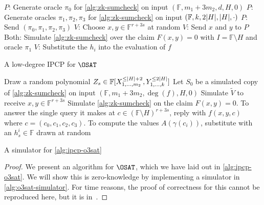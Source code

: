 \documentclass[english,12pt]{reedthesis}
\theoremstyle{plain}
\theoremstyle{definition}
\theoremstyle{remark}
\DeclarePairedDelimiter{\abs}{\lvert}{\rvert}
\begin{document}
\begin{algorithm}[htbp]
  $P$: Generate oracle $\pi_{0}$ for \cref{alg:zk-sumcheck} on input
  $(\mathbb{F}, m_{1}+3m_{2}, d, H, 0)$\;
  $P$: Generate oracles $\pi_{1}, \pi_{2}, \pi_{3}$ for \cref{alg:zk-sumcheck} on
  input $(\mathbb{F}, k, 2\abs{H}, \abs{H}, \cdot)$\;
  $P$: Send $(\pi_{0}, \pi_{1}, \pi_{2}, \pi_{3})$\;
  $V$: Choose $x, y \in \mathbb{F}^{r+3s}$ at random\;
  $V$: Send $x$ and $y$ to $P$\;
  Both: Simulate \cref{alg:zk-sumcheck} over the claim $F(x, y) = 0$ with
  $I = \mathbb{F} \setminus H$ and oracle $\pi_{1}$\;
  $V$: Substitute the $h_{i}$ into the evaluation of $f$\;
  \caption{A low-degree IPCP for $\OSAT$~\cite[p.\ 15:36]{CFGS22}}\label{alg:ipcp-o3sat}
\end{algorithm}

\begin{algorithm}[htbp]
  Draw a random polynomial
  $Z_{s} \in \mathbb{F}[X_{1, \ldots, m_{2}}^{\le \abs{H}+2}, Y_{1, \ldots, k}^{\le 2\abs{H}}]$\;
  Let $S_{0}$ be a simulated copy of \cref{alg:zk-sumcheck} on input
  $(\mathbb{F}, m_{1} + 3m_{2}, \deg(f), H, 0)$\;
  Simulate $\tilde{V}$ to receive $x, y \in \mathbb{F}^{r + 3s}$\;
  Simulate \cref{alg:zk-sumcheck} on the claim $F(x, y) = 0$. To answer the
  single query it makes at $c \in (\mathbb{F} \setminus H)^{r+3s}$, reply with
  $f(x, y, c)$ where $c = (c_{0}, c_{1}, c_{2}, c_{3})$. To compute the values
  $A(\gamma(c_{i}))$, substitute with an $h_{s}^{i} \in \mathbb{F}$ drawn at random\;
  \caption{A simulator for \cref{alg:ipcp-o3sat}~\cite[p.\ 15.37]{CFGS22}}\label{alg:o3sat-simulator}
\end{algorithm}

\begin{proof}
  We present an algorithm for $\OSAT$, which we have laid out in
  \cref{alg:ipcp-o3sat}. We will show this is zero-knowledge by implementing a
  simulator in \cref{alg:o3sat-simulator}. For time reasons, the proof of
  correctness for this cannot be reproduced here, but it is in~\cite[Theorem
  14.2]{CFGS22}.
\end{proof}
\end{document}
